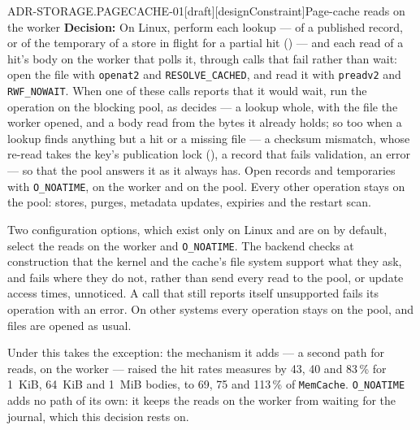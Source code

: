 \begin{requirement}{ADR-STORAGE.PAGECACHE-01}[draft][designConstraint]{Page-cache reads on the worker}
  \textbf{Decision:} On Linux, perform each lookup --- of a published record,
  or of the temporary of a store in flight for a partial hit
  () --- and each read of a hit's body on the
  worker that polls it, through calls that fail rather than wait: open the
  file with \texttt{openat2} and \texttt{RESOLVE\_CACHED}, and read it with
  \texttt{preadv2} and \texttt{RWF\_NOWAIT}. When one of these calls reports
  that it would wait, run the operation on the blocking pool, as
   decides --- a lookup whole, with the file
  the worker opened, and a body read from the bytes it already holds; so too when a lookup finds anything but a hit or a missing file ---
  a checksum mismatch, whose re-read takes the key's publication lock
  (), a record that fails validation, an
  error --- so that the pool answers it as it always has. Open records and
  temporaries with \texttt{O\_NOATIME}, on the worker and on the pool.
  Every other operation stays on the pool: stores, purges, metadata updates,
  expiries and the restart scan.

  Two configuration options, which exist only on Linux and are on by
  default, select the reads on the worker and \texttt{O\_NOATIME}. The
  backend checks at construction that the kernel and the cache's file
  system support what they ask, and fails where they do not, rather than
  send every read to the pool, or update access times, unnoticed. A call
  that still reports itself unsupported fails its operation with an error.
  On other systems every operation stays on the pool, and files are opened
  as usual.

  Under  this takes the exception: the mechanism it
  adds --- a second path for reads, on the worker --- raised the hit rates
   measures by 43, 40 and 83\,\% for 1~KiB,
  64~KiB and 1~MiB bodies, to 69, 75 and 113\,\% of \texttt{MemCache}.
  \texttt{O\_NOATIME} adds no path of its own: it keeps the reads on the
  worker from waiting for the journal, which this decision rests on.


\end{requirement}

